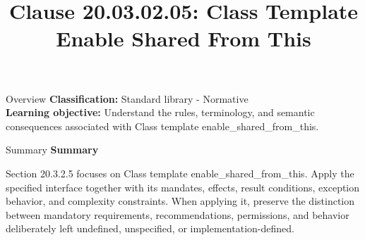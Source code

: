 \documentclass[10pt,letterpaper]{article}
\title{Clause 20.03.02.05: Class Template Enable Shared From This}
\author{}
\date{}
\begin{document}
\maketitle
\begin{CornellOverviewBox}{Overview}
\textbf{Classification:} Standard library - Normative\\[2pt]
\textbf{Learning objective:} Understand the rules, terminology, and semantic consequences associated with Class template enable\_shared\_from\_this.
\end{CornellOverviewBox}\begin{CornellSummaryBox}{Summary}
{\sffamily\bfseries\color{Accent} Summary}\par\vspace{3pt}Section 20.3.2.5 focuses on Class template enable\_shared\_from\_this. Apply the specified interface together with its mandates, effects, result conditions, exception behavior, and complexity constraints. When applying it, preserve the distinction between mandatory requirements, recommendations, permissions, and behavior deliberately left undefined, unspecified, or implementation-defined.
\end{CornellSummaryBox}
\end{document}
